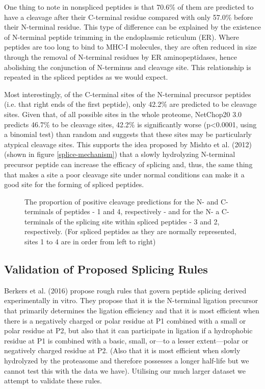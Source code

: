 \documentclass[10pt,a4paper,twoside,twocolumn]{article}
\begin{document}
One thing to note in nonspliced peptides is that 70.6\% of them are predicted to have a cleavage after their C-terminal residue compared with only 57.0\% before their N-terminal residue. This type of difference can be explained by the existence of N-terminal peptide trimming in the endoplasmic reticulum (ER). Where peptides are too long to bind to MHC-I molecules, they are often reduced in size through the removal of N-terminal residues by ER aminopeptidases, hence abolishing the conjunction of N-terminus and cleavage site. This relationship is repeated in the spliced peptides as we would expect.

Most interestingly, of the C-terminal sites of the N-terminal precursor peptides (i.e. that right ends of the first peptide), only 42.2\% are predicted to be cleavage sites. Given that, of all possible sites in the whole proteome, NetChop20 3.0 predicts 46.7\% to be cleavage sites, 42.2\% is significantly worse (p<0.0001, using a binomial test) than random and suggests that these sites may be particularly atypical cleavage sites. This supports the idea proposed by Mishto et al. (2012) \cite{mishto2012} (shown in figure \ref{splice-mechanism}) that a slowly hydrolyzing N-terminal precursor peptide can increase the efficacy of splicing and, thus, the same thing that makes a site a poor cleavage site under normal conditions can make it a good site for the forming of spliced peptides.

	\begin{figure}
		\setlength\figureheight{6cm}
		\setlength{}
		
		\caption{The proportion of positive cleavage predictions for the N- and C-terminals of peptides - 1 and 4, respectively - and for the N- a C-terminals of the splicing site within spliced peptides - 3 and 2, respectively. (For spliced peptides as they are normally represented, sites 1 to 4 are in order from left to right)}
		\label{netchop-cleavage}
	\end{figure}
\subsection*{Validation of Proposed Splicing Rules}
Berkers et al. (2016)\cite{Berkers2015} propose rough rules that govern peptide splicing derived experimentally in vitro. They propose that it is the N-terminal ligation precursor that primarily determines the ligation efficiency and that it is most efficient when there is a negatively charged or polar residue at P1 combined with a small or polar residue at P2, but also that it can participate in ligation if a hydrophobic residue at P1 is combined with a basic, small, or—to a lesser extent—polar or negatively charged residue at P2. (Also that it is most efficient when slowly hydrolyzed by the proteasome and therefore possesses a longer half-life but we cannot test this with the data we have). Utilising our much larger dataset we attempt to validate these rules.
\end{document}
